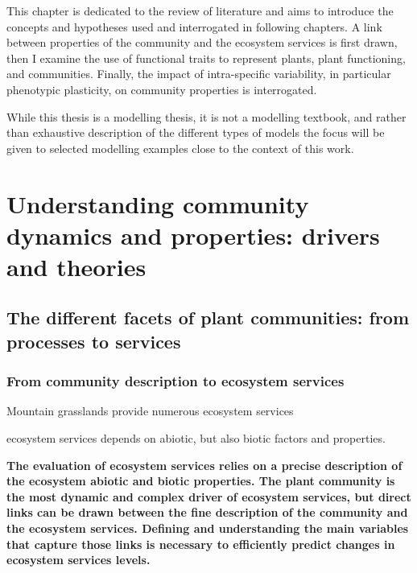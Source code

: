 \begin{fullwidth}
This chapter is dedicated to the review of literature and aims to introduce the concepts and hypotheses used and interrogated in following chapters. A link between properties of the community and the ecosystem services is first drawn, then I examine the use of functional traits to represent plants, plant functioning, and communities. Finally, the impact of intra-specific variability, in particular phenotypic plasticity, on community properties is interrogated.

While this thesis is a modelling thesis, it is not a modelling textbook, and rather than exhaustive description of the different types of models the focus will be given to selected modelling examples close to the context of this work.
\end{fullwidth}

\chapter{Understanding community dynamics and properties: drivers and theories}

\section{The different facets of plant communities: from processes to services}



\subsection{From community description to ecosystem services}

Mountain grasslands provide numerous ecosystem services 

ecosystem services depends on abiotic, but also biotic factors and properties. 


\textbf{The evaluation of ecosystem services relies on a precise description of the ecosystem abiotic and biotic properties. The plant community is the most dynamic and complex driver of ecosystem services, but direct links can be drawn between the fine description of the community and the ecosystem services. Defining and understanding the main variables that capture those links is necessary to efficiently predict changes in ecosystem services levels.}

